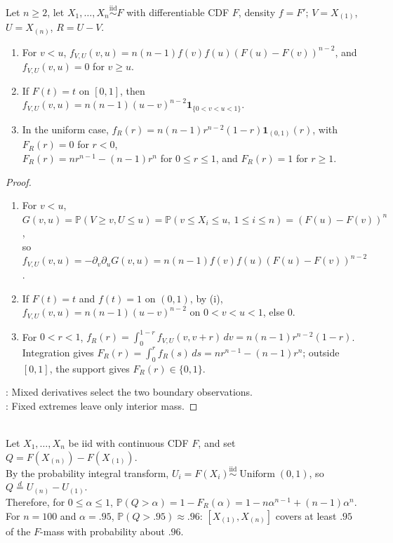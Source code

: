 \begin{proposition} \label{prop:min-max-joint-density-and-uniform-range} \\
Let $n\geq2$, let $X_1,\ldots,X_n\overset{\mathrm{iid}}{\sim}F$ with differentiable CDF $F$, density $f=F'$; $V=X_{(1)}$, $U=X_{(n)}$, $R=U-V$.
\begin{enumerate}[label=(\roman*)]
\setlength{\itemsep}{0pt}
\item For $v<u$, $f_{V,U}(v,u)=n(n-1)f(v)f(u)(F(u)-F(v))^{n-2}$, and $f_{V,U}(v,u)=0$ for $v\geq u$.
\item If $F(t)=t$ on $[0,1]$, then $f_{V,U}(v,u)=n(n-1)(u-v)^{n-2}\mathbf{1}_{\{0<v<u<1\}}$.
\item In the uniform case, $f_R(r)=n(n-1)r^{n-2}(1-r)\mathbf{1}_{(0,1)}(r)$, with $F_R(r)=0$ for $r<0$,\\
$F_R(r)=nr^{n-1}-(n-1)r^n$ for $0\leq r\leq1$, and $F_R(r)=1$ for $r\geq1$.
\end{enumerate}
\begin{proof}
\begin{enumerate}[label=(\roman*)]
\setlength{\itemsep}{0pt}
\item For $v<u$, $G(v,u)=\mathbb{P}(V\geq v,U\leq u)=\mathbb{P}(v\leq X_i\leq u,\ 1\leq i\leq n)=(F(u)-F(v))^n$,\\
so $f_{V,U}(v,u)=-\partial_v\partial_uG(v,u)=n(n-1)f(v)f(u)(F(u)-F(v))^{n-2}$.
\item If $F(t)=t$ and $f(t)=1$ on $(0,1)$, by (i), $f_{V,U}(v,u)=n(n-1)(u-v)^{n-2}$ on $0<v<u<1$, else $0$.
\item For $0<r<1$, $f_R(r)=\int_0^{1-r}f_{V,U}(v,v+r)\,dv=n(n-1)r^{n-2}(1-r)$.\\
Integration gives $F_R(r)=\int_0^r f_R(s)\,ds=nr^{n-1}-(n-1)r^n$; outside $[0,1]$, the support gives $F_R(r)\in\{0,1\}$.
\end{enumerate}
: Mixed derivatives select the two boundary observations.\\
: Fixed extremes leave only interior mass.
\end{proof}
\end{proposition}

\begin{example} \label{ex:distribution-free-tolerance-interval-from-range} \\
Let $X_1,\ldots,X_n$ be iid with continuous CDF $F$, and set $Q=F(X_{(n)})-F(X_{(1)})$.\\
By the probability integral transform, $U_i=F(X_i)\overset{\mathrm{iid}}{\sim}\operatorname{Uniform}(0,1)$, so $Q\stackrel{d}{=}U_{(n)}-U_{(1)}$.\\
Therefore, for $0\leq\alpha\leq1$, $\mathbb{P}(Q>\alpha)=1-F_R(\alpha)=1-n\alpha^{n-1}+(n-1)\alpha^n$. For $n=100$ and $\alpha=.95$, $\mathbb{P}(Q>.95)\approx.96$: $[X_{(1)},X_{(n)}]$ covers at least $.95$ of the $F$-mass with probability about $.96$.
\end{example}

